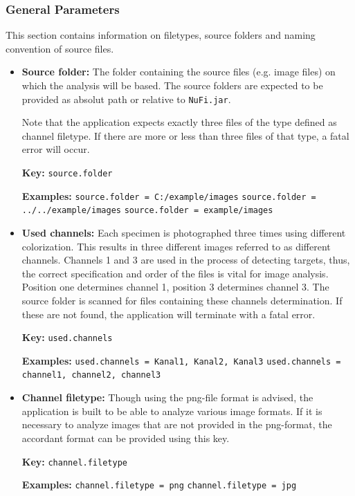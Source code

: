 \documentclass[a4paper, 12pt]{article}
\newcommand{\code}[1]{\colorbox{codegray}{\texttt{#1}}}
\begin{document}
\subsubsection{General Parameters}
This section contains information on filetypes, source folders and naming
convention of source files.
\begin{itemize}
  \item \textbf{Source folder:} The folder containing the source files (e.g.
  image files) on which the analysis will be based. The source folders are
  expected to be provided as absolut path or relative to \code{NuFi.jar}.
  
  Note that the application expects exactly three files of the type defined as
  channel filetype. If there are more or less than three files of that type, a
  fatal error will occur.
  
  \textbf{Key:}
  \newline \code{source.folder}
  
  \textbf{Examples:}
  \newline \code{source.folder = C:/example/images}
  \newline \code{source.folder = ../../example/images}
  \newline \code{source.folder = example/images}
  
  \item \textbf{Used channels:} Each specimen is photographed three times
  using different colorization. This results in three different images
  referred to as different channels. Channels 1 and 3 are used in the process
  of detecting targets, thus, the correct specification and order of the
  files is vital for image analysis. Position one determines channel 1,
  position 3 determines channel 3. The source folder is scanned for files
  containing these channels determination. If these are not found, the
  application will terminate with a fatal error.
  
  \textbf{Key:}
  \newline \code{used.channels}
  
  \textbf{Examples:}
  \newline \code{used.channels = Kanal1, Kanal2, Kanal3}
  \newline \code{used.channels = channel1, channel2, channel3}
  
  \item \textbf{Channel filetype:} Though using the png-file format is advised,
  the application is built to be able to analyze various image formats. If it
  is necessary to analyze images that are not provided in the png-format, the
  accordant format can be provided using this key.
  
  \textbf{Key:}
  \newline \code{channel.filetype}
  
  \textbf{Examples:}
  \newline \code{channel.filetype = png}
  \newline \code{channel.filetype = jpg}
\end{itemize}
\end{document}
